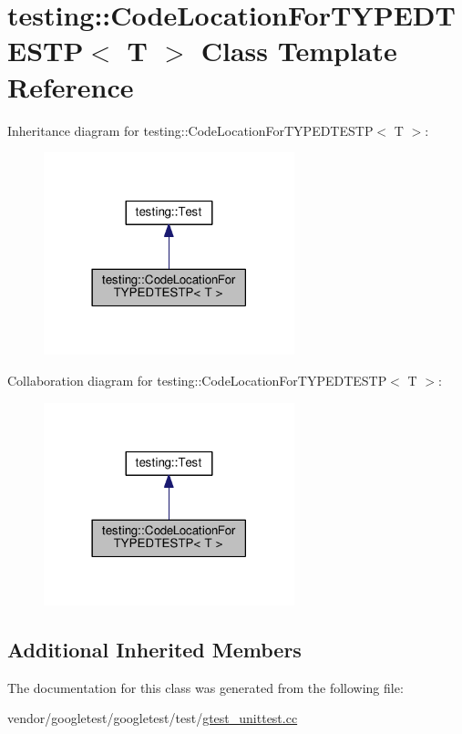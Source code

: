 \hypertarget{classtesting_1_1CodeLocationForTYPEDTESTP}{}\section{testing\+:\+:Code\+Location\+For\+T\+Y\+P\+E\+D\+T\+E\+S\+TP$<$ T $>$ Class Template Reference}
\label{classtesting_1_1CodeLocationForTYPEDTESTP}


Inheritance diagram for testing\+:\+:Code\+Location\+For\+T\+Y\+P\+E\+D\+T\+E\+S\+TP$<$ T $>$\+:
\nopagebreak
\begin{figure}[H]
\begin{center}
\leavevmode
\includegraphics[width=206pt]{classtesting_1_1CodeLocationForTYPEDTESTP__inherit__graph}
\end{center}
\end{figure}


Collaboration diagram for testing\+:\+:Code\+Location\+For\+T\+Y\+P\+E\+D\+T\+E\+S\+TP$<$ T $>$\+:
\nopagebreak
\begin{figure}[H]
\begin{center}
\leavevmode
\includegraphics[width=206pt]{classtesting_1_1CodeLocationForTYPEDTESTP__coll__graph}
\end{center}
\end{figure}
\subsection*{Additional Inherited Members}


The documentation for this class was generated from the following file\+:\begin{DoxyCompactItemize}
\item 
vendor/googletest/googletest/test/\hyperlink{gtest__unittest_8cc}{gtest\+\_\+unittest.\+cc}\end{DoxyCompactItemize}

